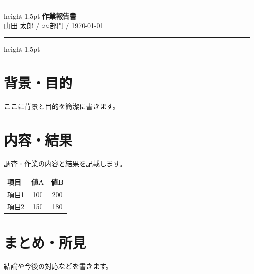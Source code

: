 \documentclass[a4paper, 11pt]{ltjsarticle}
\begin{document}
\begin{center}
  \hrule height 1.5pt \vspace{6pt}
  {\LARGE\bfseries 作業報告書}\\[3pt]
  {\small 山田 太郎 / ○○部門 / \today}
  \vspace{6pt}\hrule height 1.5pt
\end{center}

\section{背景・目的}
ここに背景と目的を簡潔に書きます。

\section{内容・結果}
調査・作業の内容と結果を記載します。

\begin{center}
\begin{tabular}{@{}lcc@{}}
  \toprule
  項目 & 値A & 値B \\
  \midrule
  項目1 & 100 & 200 \\
  項目2 & 150 & 180 \\
  \bottomrule
\end{tabular}
\end{center}

\section{まとめ・所見}
結論や今後の対応などを書きます。
\end{document}
